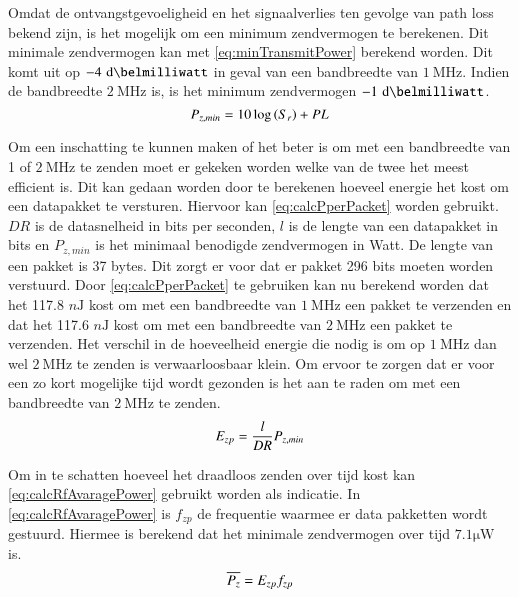 Omdat de ontvangstgevoeligheid en het signaalverlies ten gevolge van path loss bekend zijn, is het mogelijk om een minimum zendvermogen te berekenen. Dit minimale zendvermogen kan met \autoref{eq:minTransmitPower} berekend worden. Dit komt uit op $-4\,\,\si{\deci\belmilliwatt}$ in geval van een bandbreedte van $\SI{1}{\mega\hertz}$. Indien de bandbreedte $\SI{2}{\mega\hertz}$ is, is het minimum zendvermogen $-1\,\,\si{\deci\belmilliwatt}$.
\begin{equation}\label{eq:minTransmitPower}
    P_{z,min}= 10\log\left(S_r\right) + PL
    \tagaddtext{[\si{\deci\belmilliwatt}]}
\end{equation}

Om een inschatting te kunnen maken of het beter is om met een bandbreedte van 1 of $\SI{2}{\mega\hertz}$ te zenden moet er gekeken worden welke van de twee het meest efficient is. Dit kan gedaan worden door te berekenen hoeveel energie het kost om een datapakket te versturen. Hiervoor kan \autoref{eq:calcPperPacket} worden gebruikt. $DR$ is de datasnelheid in bits per seconden, $l$ is de lengte van een datapakket in bits en $P_{z,min}$ is het minimaal benodigde zendvermogen in Watt. De lengte van een pakket is 37 bytes. Dit zorgt er voor dat er pakket 296 bits moeten worden verstuurd. Door \autoref{eq:calcPperPacket} te gebruiken kan nu berekend worden dat het 117.8 $\si{n\joule}$ kost om met een bandbreedte van $\SI{1}{\mega\hertz}$ een pakket te verzenden en dat het 117.6 $\si{n\joule}$ kost om met een bandbreedte van $\SI{2}{\mega\hertz}$ een pakket te verzenden. Het verschil in de hoeveelheid energie die nodig is om op $\SI{1}{\mega\hertz}$ dan wel $\SI{2}{\mega\hertz}$ te zenden is verwaarloosbaar klein. Om ervoor te zorgen dat er voor een zo kort mogelijke tijd wordt gezonden is het aan te raden om met een bandbreedte van $\SI{2}{\mega\hertz}$ te zenden.
\begin{equation}\label{eq:calcPperPacket}
    E_{zp}=\frac{l}{DR}P_{z,min}
    \tagaddtext{[\si{\joule}]}
\end{equation}

Om in te schatten hoeveel het draadloos zenden over tijd kost kan \autoref{eq:calcRfAvaragePower} gebruikt worden als indicatie. In \autoref{eq:calcRfAvaragePower} is $f_{zp}$ de frequentie waarmee er data pakketten wordt gestuurd. Hiermee is berekend dat het minimale zendvermogen over tijd $7.1\si{\micro\watt}$ is.
\begin{equation}\label{eq:calcRfAvaragePower}
    \overline{P_{z}}=E_{zp}f_{zp}
    \tagaddtext{[\si{\watt}]}
\end{equation}



